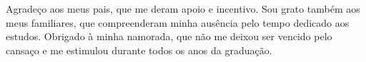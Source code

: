 \begin{agradecimentos}

Agradeço aos meus pais, que me deram apoio e incentivo. Sou grato também aos meus familiares, que compreenderam minha ausência pelo tempo dedicado aos estudos. Obrigado à minha namorada, que não me deixou ser vencido pelo cansaço e me estimulou durante todos os anos da graduação.

\end{agradecimentos}
